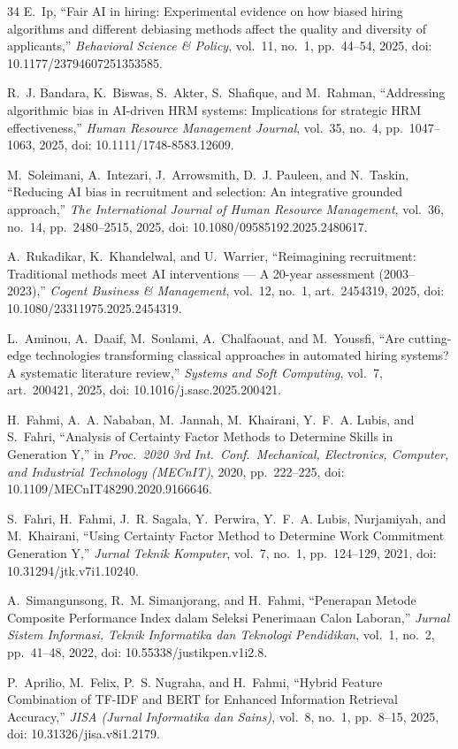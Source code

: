 \documentclass[journal]{IEEEtran}
\begin{document}
\begin{thebibliography}{34}
E.~Ip, ``Fair AI in hiring: Experimental evidence on how biased hiring algorithms and different debiasing methods affect the quality and diversity of applicants,'' \emph{Behavioral Science \& Policy}, vol.~11, no.~1, pp.~44--54, 2025, doi: 10.1177/23794607251353585.

R.~J. Bandara, K.~Biswas, S.~Akter, S.~Shafique, and M.~Rahman, ``Addressing algorithmic bias in AI-driven HRM systems: Implications for strategic HRM effectiveness,'' \emph{Human Resource Management Journal}, vol.~35, no.~4, pp.~1047--1063, 2025, doi: 10.1111/1748-8583.12609.

M.~Soleimani, A.~Intezari, J.~Arrowsmith, D.~J. Pauleen, and N.~Taskin, ``Reducing AI bias in recruitment and selection: An integrative grounded approach,'' \emph{The International Journal of Human Resource Management}, vol.~36, no.~14, pp.~2480--2515, 2025, doi: 10.1080/09585192.2025.2480617.

A.~Rukadikar, K.~Khandelwal, and U.~Warrier, ``Reimagining recruitment: Traditional methods meet AI interventions --- A 20-year assessment (2003--2023),'' \emph{Cogent Business \& Management}, vol.~12, no.~1, art.~2454319, 2025, doi: 10.1080/23311975.2025.2454319.

L.~Aminou, A.~Daaif, M.~Soulami, A.~Chalfaouat, and M.~Youssfi, ``Are cutting-edge technologies transforming classical approaches in automated hiring systems? A systematic literature review,'' \emph{Systems and Soft Computing}, vol.~7, art.~200421, 2025, doi: 10.1016/j.sasc.2025.200421.

H.~Fahmi, A.~A. Nababan, M.~Jannah, M.~Khairani, Y.~F.~A. Lubis, and S.~Fahri, ``Analysis of Certainty Factor Methods to Determine Skills in Generation Y,'' in \emph{Proc.\ 2020 3rd Int.\ Conf.\ Mechanical, Electronics, Computer, and Industrial Technology (MECnIT)}, 2020, pp.~222--225, doi: 10.1109/MECnIT48290.2020.9166646.

S.~Fahri, H.~Fahmi, J.~R. Sagala, Y.~Perwira, Y.~F.~A. Lubis, Nurjamiyah, and M.~Khairani, ``Using Certainty Factor Method to Determine Work Commitment Generation Y,'' \emph{Jurnal Teknik Komputer}, vol.~7, no.~1, pp.~124--129, 2021, doi: 10.31294/jtk.v7i1.10240.

A.~Simangunsong, R.~M. Simanjorang, and H.~Fahmi, ``Penerapan Metode Composite Performance Index dalam Seleksi Penerimaan Calon Laboran,'' \emph{Jurnal Sistem Informasi, Teknik Informatika dan Teknologi Pendidikan}, vol.~1, no.~2, pp.~41--48, 2022, doi: 10.55338/justikpen.v1i2.8.

P.~Aprilio, M.~Felix, P.~S. Nugraha, and H.~Fahmi, ``Hybrid Feature Combination of TF-IDF and BERT for Enhanced Information Retrieval Accuracy,'' \emph{JISA (Jurnal Informatika dan Sains)}, vol.~8, no.~1, pp.~8--15, 2025, doi: 10.31326/jisa.v8i1.2179.

\end{thebibliography}
\end{document}
